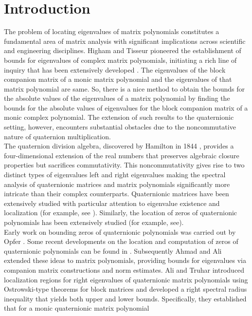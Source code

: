 \documentclass [12pt]{article}
\begin{document}
\section{Introduction}
The problem of locating eigenvalues of matrix polynomials constitutes a fundamental area of matrix analysis with significant implications across scientific and engineering disciplines. Higham and Tisseur \cite{HT} pioneered the establishment of bounds for eigenvalues of complex matrix polynomials, initiating a rich line of inquiry that has been extensively developed \cite{BDN, BM, MCP, NVS}. The eigenvalues of the block companion matrix of a monic matrix polynomial and the eigenvalues of that matrix polynomial are same. So, there is a nice method to obtain the bounds for the absolute values of the eigenvalues of a matrix polynomial by finding the bounds for the absolute values of eigenvalues for the block companion matrix of a monic complex polynomial. The extension of such results to the quaternionic setting, however, encounters substantial obstacles due to the noncommutative nature of quaternion multiplication.\\
\indent The quaternion division algebra, discovered by Hamilton in 1844 \cite{WR}, provides a four-dimensional extension of the real numbers that preserves algebraic closure properties but sacrifices commutativity. This noncommutativity gives rise to two distinct types of eigenvalues left and right eigenvalues making the spectral analysis of quaternionic matrices and matrix polynomials significantly more intricate than their complex counterparts. Quaternionic matrices have been extensively studied with particular attention to eigenvalue existence and localization (for example, see \cite{AS, BA, BJL, LHC}). Similarly, the location of zeros of quaternionic polynomials has been extensively studied (for example, see\cite{QI, GVM, NBD}).\\
\indent Early work on bounding zeros of quaternionic polynomials was carried out by Opfer \cite{OG}. Some recent developments on the
location and computation of zeros of quaternionic polynomials can be found in \cite{AS, QI, NBD}. Subsequently Ahmad and Ali \cite{ ASSA} extended these ideas to matrix polynomials, providing bounds for eigenvalues via companion matrix constructions and norm estimates. Ali and Truhar \cite{INT} introduced localization regions for right eigenvalues of quaternionic matrix polynomials using Ostrowski-type theorems for block matrices and developed a right spectral radius inequality that yields both upper and lower bounds. Specifically, they established that for a monic quaternionic matrix polynomial
\end{document}
